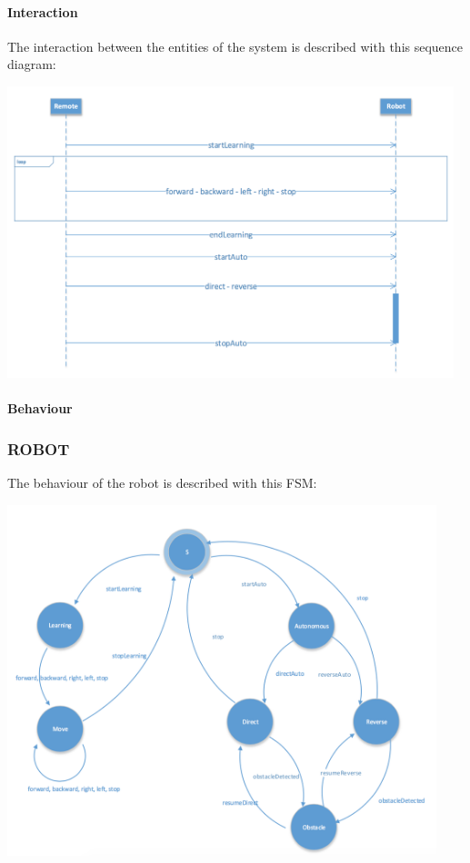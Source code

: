 \documentclass{llncs}
\begin{document}
\paragraph{Interaction}
The interaction between the entities of the system is described with this sequence diagram:
\begin{center}
   	\includegraphics[width=13cm]{img/interaction.png}\\
\end{center}
\paragraph{Behaviour}
\subsubsection{ROBOT}
The behaviour of the robot is described with this FSM:\\
\begin{center}
   	\includegraphics[width=12.5cm]{img/fsmRobot.png}\\
\end{center}
\end{document}

